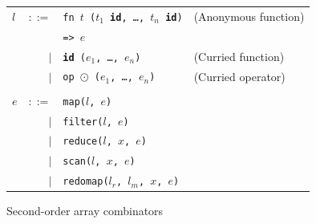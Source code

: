 \documentclass{sigplanconf}  %
\begin{document}
\begin{figure}[bt]
\begin{tabular}{lrll}
$l$ & $::=$ & {\tt fn $t$ ($t_{1}$ {\bf id}, \ldots, $t_{n}$ {\bf id})} & (Anonymous function) \\
&     & {\tt => $e$} \\
& $|$ & {\tt {\bf id} ($e_{1}$, \ldots, $e_{n}$)} & (Curried function) \\
& $|$ & {\tt op $\odot$ ($e_{1}$, \ldots, $e_{n}$)} & (Curried operator) \\
\\
$e$ & $::=$ & {\tt map($l$, $e$)} \\
    & $|$ & {\tt filter($l$, $e$)} \\
    & $|$ & {\tt reduce($l$, $x$, $e$)} \\
    & $|$ & {\tt scan($l$, $x$, $e$)} \\
    & $|$ & {\tt redomap($l_{r}$, $l_{m}$, $x$, $e$)} \\
\end{tabular}
\caption{Second-order array combinators}
\label{fig:soacs}
\end{figure}
\end{document}

